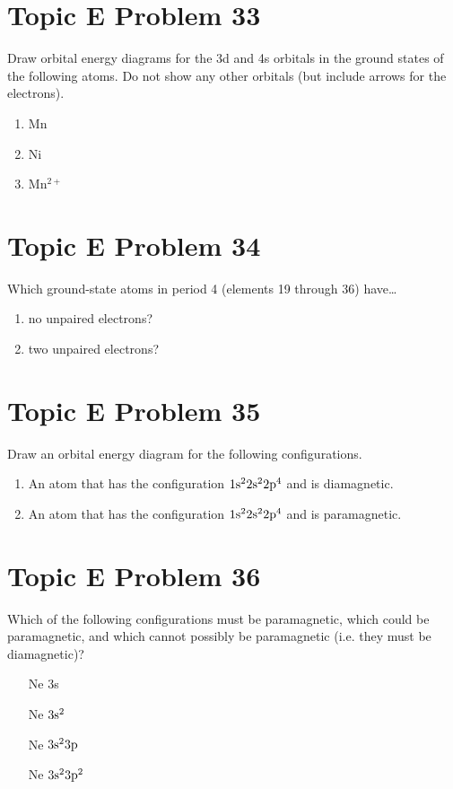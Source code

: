 \documentclass[10pt]{article}
\begin{document}
    \pagebreak
    \section{Topic E Problem 33}
        Draw orbital energy diagrams for the 3d and 4s orbitals in the ground states of the following atoms. 
        Do not show any other orbitals (but include arrows for the electrons).
        \begin{multicols}{3}
            \begin{enumerate}[label=\alph*)]
                \item   Mn
                \item   Ni
                \item   Mn$^{2+}$
            \end{enumerate}
        \end{multicols}

    \pagebreak
    \section{Topic E Problem 34}
        Which ground-state atoms in period 4 (elements 19 through 36) have…
        \begin{enumerate}[label=\alph*)]
            \item   no unpaired electrons?
            \item   two unpaired electrons?
        \end{enumerate}


    \pagebreak
    \section{Topic E Problem 35}
        Draw an orbital energy diagram for the following configurations.
        \begin{enumerate}
            \item   An atom that has the configuration $\rm 1s^2 2s^2 2p^4$ and is diamagnetic.
            \item   An atom that has the configuration $\rm 1s^2 2s^2 2p^4$ and is paramagnetic.
        \end{enumerate}

    \pagebreak
    \section{Topic E Problem 36}
        Which of the following configurations must be paramagnetic, which could be paramagnetic, and which cannot possibly be paramagnetic (i.e. they must be diamagnetic)?
        \begin{enumerate}[label=\alph*)]
            \item   [Ne]3s
            \item   [Ne]$\rm 3s^2$
            \item   [Ne]$\rm 3s^2 3p$
            \item   [Ne]$\rm 3s^2 3p^2$
        \end{enumerate}
\end{document}
